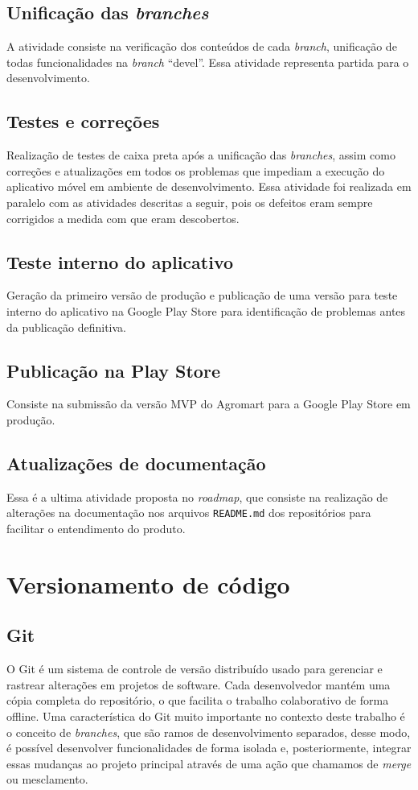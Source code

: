 \subsection{Unificação das \textit{branches}}
A atividade consiste na verificação dos conteúdos de cada \textit{branch}, unificação de todas funcionalidades na \textit{branch} “devel”. Essa atividade representa partida para o desenvolvimento.

\subsection{Testes e correções}
Realização de testes de caixa preta após a unificação das \textit{branches}, assim como correções e atualizações em todos os problemas que impediam a execução do aplicativo móvel em ambiente de desenvolvimento. Essa atividade foi realizada em paralelo com as atividades descritas a seguir, pois os defeitos eram sempre corrigidos a medida com que eram descobertos.

\subsection{Teste interno do aplicativo}
Geração da primeiro versão de produção e publicação de uma versão para teste interno do aplicativo na Google Play Store para identificação de problemas antes da publicação definitiva.

\subsection{Publicação na Play Store}
Consiste na submissão da versão MVP do Agromart para a Google Play Store em produção.

\subsection{Atualizações de documentação}
Essa é a ultima atividade proposta no \textit{roadmap}, que consiste na realização de alterações na documentação nos arquivos \texttt{README.md} dos repositórios para facilitar o entendimento do produto. 

\section{Versionamento de código}

\subsection{Git}
O Git \cite{git2024} é um sistema de controle de versão distribuído usado para gerenciar e rastrear alterações em projetos de software. Cada desenvolvedor mantém uma cópia completa do repositório, o que facilita o trabalho colaborativo de forma offline. Uma característica do Git muito importante no contexto deste trabalho é o conceito de \textit{branches}, que são ramos de desenvolvimento separados, desse modo, é possível desenvolver funcionalidades de forma isolada e, posteriormente, integrar essas mudanças ao projeto principal através de uma ação que chamamos de \textit{merge} ou mesclamento.

